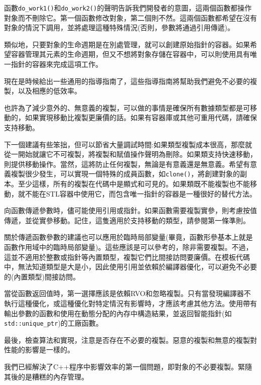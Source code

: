 函數\texttt{do\_work1()}和\texttt{do\_work2()}的聲明告訴我們開發者的意圖，這兩個函數都操作對象而不刪除它。第一個函數修改對象，第二個則不然。這兩個函數都希望在沒有對象的情況下調用，並將處理這種特殊情況(否則，參數將通過引用傳遞)。 

類似地，只要對象的生命週期是在別處管理，就可以創建原始指針的容器。如果希望容器管理其元素的生命週期，但又不想將對象存儲在容器中，可以則使用具有唯一指針的容器來完成這項工作。 

現在是時候給出一些通用的指導指南了，這些指導指南將幫助我們避免不必要的複製，以及相應的低效率。


也許為了減少意外的、無意義的複製，可以做的事情是確保所有數據類型都是可移動的，如果實現移動比複製更廉價的話。如果有容器庫或其他可重用代碼，請確保支持移動。 

下一個建議有些笨拙，但可以節省大量調試時間:如果類型複製成本很高，那麼就從一開始就讓它不可複製，將複製和賦值操作聲明為刪除。如果類支持快速移動，則提供移動操作。當然，這將防止任何複製，無論是有意義還是無意義。希望有意義複製很少發生，可以實現一個特殊的成員函數，如\texttt{clone()}，將創建對象的副本。至少這樣，所有的複製在代碼中是顯式和可見的。如果類既不能複製也不能移動，就不能在STL容器中使用它，而包含唯一指針的容器是一種很好的替代方法。 

向函數傳遞參數時，儘可能使用引用或指針。如果函數需要複製實參，則考慮按值傳遞，並從實參移動。記住，這隻適用於支持移動的類型，請參閱第一條準則。

關於傳遞函數參數的建議也可以應用於臨時局部變量(畢竟，函數形參基本上就是函數作用域中的臨時局部變量)。這些應該是可以參考的，除非需要複製。不過，這並不適用於整數或指針等內置類型，複製它們比間接訪問要廉價。在模板代碼中，無法知道類型是大是小，因此使用引用並依賴於編譯器優化，可以避免不必要的(內置類型)間接訪問。

當從函數返回值時，第一選擇應該是依賴RVO和忽略複製。只有當發現編譯器不執行這種優化，或這種優化對特定情況有影響時，才應該考慮其他方法。使用帶有輸出參數的函數和使用在動態分配的內存中構造結果，並返回智能指針(如\texttt{std::unique\_ptr})的工廠函數。 

最後，檢查算法和實現，注意是否存在不必要的複製。惡意的複製和無意的複製對性能的影響是一樣的。

我們已經解決了C++程序中影響效率的第一個問題，即對象的不必要複製。緊隨其後的是糟糕的內存管理。















